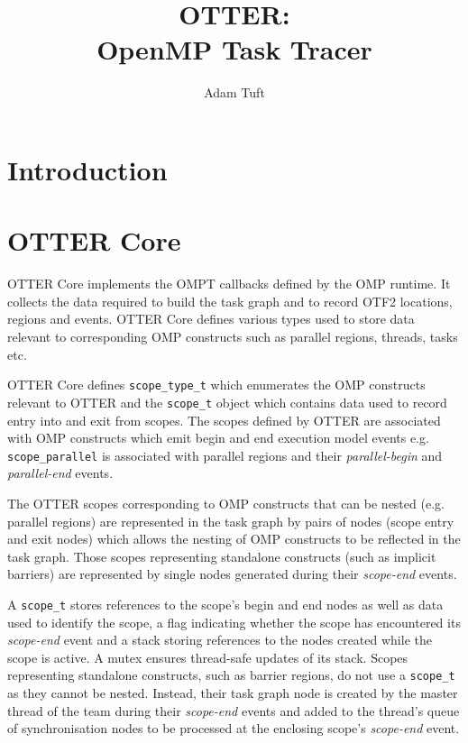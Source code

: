 \documentclass[11pt,a4paper]{article}
\title{OTTER:\\OpenMP Task Tracer}
\newcommand{\code}[1]{\texttt{#1} }
\begin{document}
\author{Adam Tuft}
\maketitle

\tableofcontents

\pagebreak

\section{Introduction}

\section{OTTER Core}

OTTER Core implements the OMPT callbacks defined by the OMP runtime. It collects the data required to build the task graph and to record OTF2 locations, regions and events. OTTER Core defines various types used to store data relevant to corresponding OMP constructs such as parallel regions, threads, tasks etc.

OTTER Core defines \code{scope\_type\_t} which enumerates the OMP constructs relevant to OTTER and the \code{scope\_t} object which contains data used to record entry into and exit from scopes. The scopes defined by OTTER are associated with OMP constructs which emit begin and end execution model events e.g. \code{scope\_parallel} is associated with parallel regions and their \emph{parallel-begin} and \emph{parallel-end} events.

The OTTER scopes corresponding to OMP constructs that can be nested (e.g. parallel regions) are represented in the task graph by pairs of nodes (scope entry and exit nodes) which allows the nesting of OMP constructs to be reflected in the task graph. Those scopes representing standalone constructs (such as implicit barriers) are represented by single nodes generated during their \emph{scope-end} events.

A \code{scope\_t} stores references to the scope's begin and end nodes as well as data used to identify the scope, a flag indicating whether the scope has encountered its \emph{scope-end} event and a stack storing references to the nodes created while the scope is active. A mutex ensures thread-safe updates of its stack. Scopes representing standalone constructs, such as barrier regions, do not use a \code{scope\_t} as they cannot be nested. Instead, their task graph node is created by the master thread of the team during their \emph{scope-end} events and added to the thread's queue of synchronisation nodes to be processed at the enclosing scope's \emph{scope-end} event.
\end{document}
